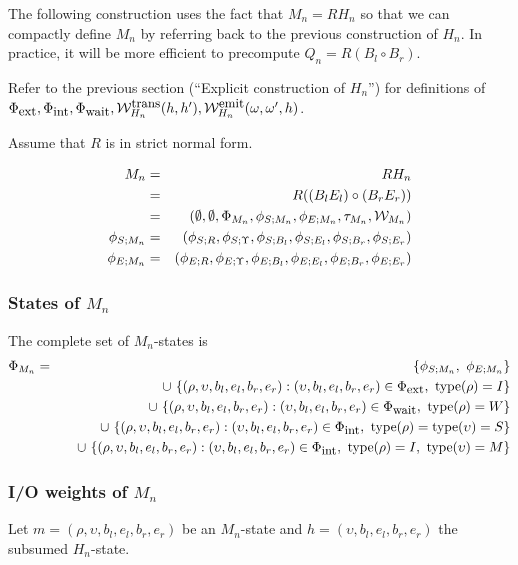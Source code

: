 \documentclass{article}
\newcommand\compose{}
\newcommand\fork{\circ}
\newcommand\idfork{\Upsilon}
\newcommand\States{\Phi}
\newcommand\statesof[1]{\States_{#1}}
\newcommand\Transitions{\tau}
\newcommand\transitionsof[1]{\Transitions_{#1}}
\newcommand\startstateof[1]{\phi_{S;#1}}
\newcommand\laststateof[1]{\phi_{E;#1}}
\newcommand\weight{{\cal W}}
\newcommand\weightfunof[1]{\weight_{#1}}
\newcommand\transweightfun[1]{\weightfunof{#1}^{\mbox{\small trans}}}
\newcommand\emitweightfun[1]{\weightfunof{#1}^{\mbox{\small emit}}}
\newcommand\statetype{\mbox{type}}
\newcommand\stateset[1]{\statesof{\mbox{\small #1}}}
\newcommand\hstate{(\upsilon,b_l,e_l,b_r,e_r)}
\newcommand\externalsuffix{ext}
\newcommand\internalsuffix{int}
\newcommand\waitsuffix{wait}
\newcommand\externalcascades{\stateset{\externalsuffix}}
\newcommand\internalcascades{\stateset{\internalsuffix}}
\newcommand\waitstates{\stateset{\waitsuffix}}
\newcommand\mstate{(\rho,\upsilon,b_l,e_l,b_r,e_r)}
\begin{document}
The following construction uses the fact that $M_n = R \compose H_n$ so that we can compactly define $M_n$ by referring back to the previous construction of $H_n$.
In practice, it will be more efficient to precompute $Q_n = R \compose (B_l \fork B_r)$.

Refer to the previous section (``Explicit construction of $H_n$'') for definitions of
$\externalcascades,\internalcascades,\waitstates,\transweightfun{H_n}(h,h'),\emitweightfun{H_n}(\omega,\omega',h)$.

Assume that $R$ is in strict normal form.

\begin{eqnarray*}
M_n & = & R \compose H_n \\
& = & R \compose ((B_l \compose E_l) \fork (B_r \compose E_r)) \\
& = & (\emptyset,\emptyset,\statesof{M_n},\startstateof{M_n},\laststateof{M_n},\transitionsof{M_n},\weightfunof{M_n}) \\
\startstateof{M_n} & = & (\startstateof{R},\startstateof{\idfork},\startstateof{B_l},\startstateof{E_l},\startstateof{B_r},\startstateof{E_r}) \\
\laststateof{M_n} & = & (\laststateof{R},\laststateof{\idfork},\laststateof{B_l},\laststateof{E_l},\laststateof{B_r},\laststateof{E_r})
\end{eqnarray*}

\subsubsection{States of $M_n$}
The complete set of $M_n$-states is
\begin{eqnarray*}
\statesof{M_n} & = & \{ \startstateof{M_n},\ \laststateof{M_n} \} \\
& & \quad \cup\ \{ \mstate: \hstate \in \externalcascades,\ \statetype(\rho)=I \} \\
& & \quad \cup\ \{ \mstate: \hstate \in \waitstates,\ \statetype(\rho)=W \} \\
& & \quad \cup\ \{ \mstate: \hstate \in \internalcascades,\ \statetype(\rho)=\statetype(\upsilon)=S \} \\
& & \quad \cup\ \{ \mstate: \hstate \in \internalcascades,\ \statetype(\rho)=I,\ \statetype(\upsilon)=M \}
\end{eqnarray*}

\subsubsection{I/O weights of $M_n$}
Let $m = \mstate$ be an $M_n$-state and $h = \hstate$ the subsumed $H_n$-state.
\end{document}
